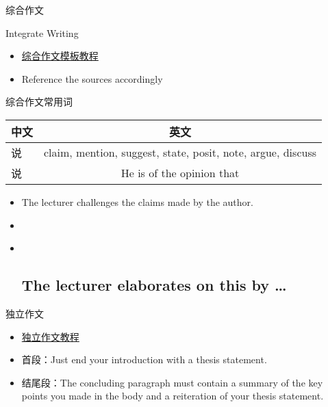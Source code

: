 \documentclass[ignorenonframetext,]{beamer}
\begin{document}
\begin{frame}{综合作文}
\protect\hypertarget{ux7efcux5408ux4f5cux6587}{}

Integrate Writing

\begin{itemize}
\item
  \href{https://www.toeflresources.com/writing-section/integrated-writing}{综合作文模板教程}
\item
  Reference the sources accordingly
\end{itemize}

\end{frame}

\begin{frame}{综合作文常用词}
\protect\hypertarget{ux7efcux5408ux4f5cux6587ux5e38ux7528ux8bcd}{}

\begin{longtable}[]{@{}lc@{}}
\toprule
中文 & 英文\tabularnewline
\midrule
\endhead
说 & claim, mention, suggest, state, posit, note, argue,
discuss\tabularnewline
说 & He is of the opinion that\tabularnewline
\bottomrule
\end{longtable}

\begin{itemize}
\item
  The lecturer challenges the claims made by the author.
\item
\item ~
  \hypertarget{the-lecturer-elaborates-on-this-by}{%
  \subsection{The lecturer elaborates on this by
  \ldots{}}\label{the-lecturer-elaborates-on-this-by}}
\end{itemize}

\end{frame}

\begin{frame}{独立作文}
\protect\hypertarget{ux72ecux7acbux4f5cux6587}{}

\begin{itemize}
\item
  \href{https://www.toeflresources.com/writing-section/toefl-independent-writing-section}{独立作文教程}
\item
  首段：Just end your introduction with a thesis statement.
\item
  结尾段：The concluding paragraph must contain a summary of the key
  points you made in the body and a reiteration of your thesis
  statement.
\end{itemize}

\end{frame}
\end{document}
